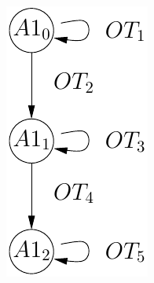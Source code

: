 \documentclass[smallcondensed]{svjour3}
\begin{document}
\begin{figure}[h]
  \begin{minipage}{2cm}
  \includegraphics[width=\linewidth]{ActaXFIG/PQR-automaton}
  \end{minipage}
  \hspace{10mm}
  \begin{minipage}{7cm}

\end{minipage}
\end{figure}
\end{document}
